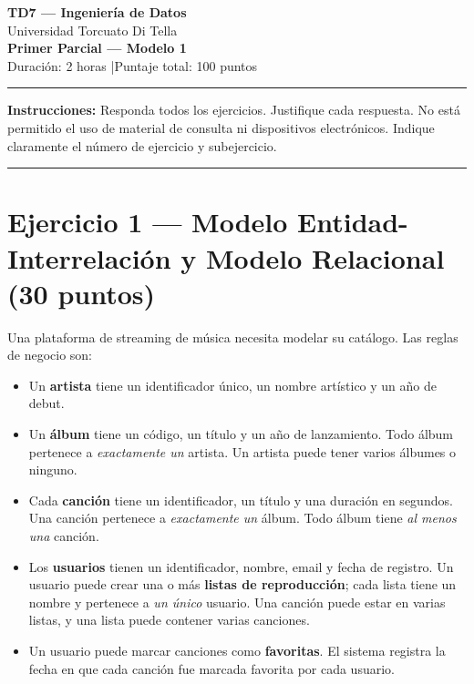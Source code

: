 \documentclass[11pt,a4paper]{article}
\begin{document}
\begin{center}
  {\LARGE\bfseries TD7 — Ingeniería de Datos}\\[6pt]
  {\large Universidad Torcuato Di Tella}\\[4pt]
  {\Large\bfseries Primer Parcial — Modelo 1}\\[4pt]
  {\normalsize Duración: 2 horas \quad|\quad Puntaje total: 100 puntos}
\end{center}
\noindent\rule{\linewidth}{0.8pt}
\vspace{2pt}

\noindent\textbf{Instrucciones:} Responda todos los ejercicios. Justifique cada respuesta. No está permitido el uso de material de consulta ni dispositivos electrónicos. Indique claramente el número de ejercicio y subejercicio.

\vspace{6pt}
\noindent\rule{\linewidth}{0.4pt}

\section*{Ejercicio 1 — Modelo Entidad-Interrelación y Modelo Relacional \hfill\normalfont(30 puntos)}

Una plataforma de streaming de música necesita modelar su catálogo. Las reglas de negocio son:

\begin{itemize}
  \item Un \textbf{artista} tiene un identificador único, un nombre artístico y un año de debut.
  \item Un \textbf{álbum} tiene un código, un título y un año de lanzamiento. Todo álbum pertenece a \emph{exactamente un} artista. Un artista puede tener varios álbumes o ninguno.
  \item Cada \textbf{canción} tiene un identificador, un título y una duración en segundos. Una canción pertenece a \emph{exactamente un} álbum. Todo álbum tiene \emph{al menos una} canción.
  \item Los \textbf{usuarios} tienen un identificador, nombre, email y fecha de registro. Un usuario puede crear una o más \textbf{listas de reproducción}; cada lista tiene un nombre y pertenece a \emph{un único} usuario. Una canción puede estar en varias listas, y una lista puede contener varias canciones.
  \item Un usuario puede marcar canciones como \textbf{favoritas}. El sistema registra la fecha en que cada canción fue marcada favorita por cada usuario.
\end{itemize}
\end{document}
